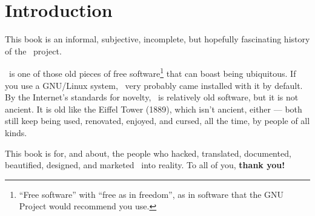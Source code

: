 
\chapter{Introduction}

This book is an informal, subjective, incomplete, but hopefully
fascinating history of the \GNOME\ project.

\GNOME\ is one of those old pieces of free software\footnote{``Free
  software'' with ``free as in freedom'', as in software that the GNU
  Project would recommend you use.} that can boast being ubiquitous.
If you use a GNU/Linux system, \GNOME\ very probably came installed
with it by default.  By the Internet's standards for novelty,
\GNOME\ is relatively old software, but it is not ancient.  It is old
like the Eiffel Tower (1889), which isn't ancient, either --- both
still keep being used, renovated, enjoyed, and cursed, all the time,
by people of all kinds.

This book is for, and about, the people who hacked, translated,
documented, beautified, designed, and marketed \GNOME\ into reality.
To all of you, {\bf thank you!}
